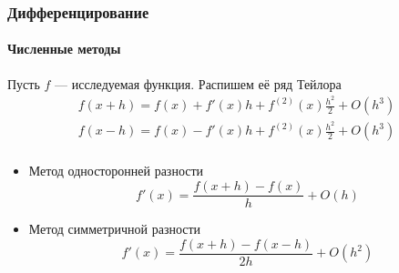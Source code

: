 \documentclass[notheorems,aspectratio=169]{beamer}
\begin{document}
\begin{frame}
  \frametitle{Дифференцирование}
  \framesubtitle{Численные методы}
  Пусть $f$ --- исследуемая функция. Распишем её ряд Тейлора
  \begin{equation*}
    \begin{gathered}
      f\left(x+h\right)=f\left(x\right)+f'\left(x\right)h+f^{(2)}\left(x\right)\frac{h^2}{2}+O\left(h^3\right) \\
      f\left(x-h\right)=f\left(x\right)-f'\left(x\right)h+f^{(2)}\left(x\right)\frac{h^2}{2}+O\left(h^3\right) \\
    \end{gathered}
  \end{equation*}

  \begin{itemize}
    \item Метод односторонней разности
      \begin{equation*}
        f'\left(x\right)=\frac{f\left(x+h\right)-f\left(x\right)}{h}+O\left(h\right)
      \end{equation*}
    \item Метод симметричной разности 
      \begin{equation*}
        f'\left(x\right)=\frac{f\left(x+h\right)-f\left(x-h\right)}{2h}+O\left(h^2\right)
      \end{equation*}
  \end{itemize}
\end{frame}
\end{document}
